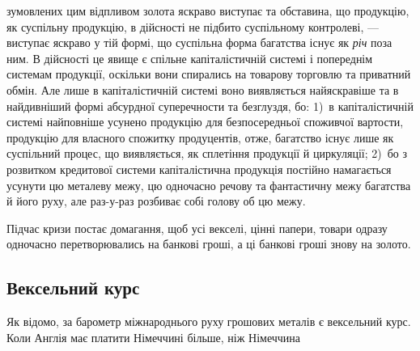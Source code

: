 зумовлених цим відпливом золота яскраво виступає та обставина, що продукцію,
як суспільну продукцію, в дійсності не підбито суспільному контролеві, —
виступає яскраво у тій формі, що суспільна форма багатства існує як \emph{річ} поза
ним. В дійсності це явище є спільне капіталістичній системі і попереднім системам
продукції, оскільки вони спирались на товарову торговлю та приватний
обмін. Але лише в капіталістичній системі воно виявляється найяскравіше та
в найдивніший формі абсурдної суперечности та безглуздя, бо: 1)~в капіталістичній
системі найповніше усунено продукцію для безпосередньої споживчої
вартости, продукцію для власного спожитку продуцентів, отже, багатство існує
лише як суспільний процес, що виявляється, як сплетіння продукції й циркуляції;
2)~бо з розвитком кредитової системи капіталістична продукція постійно
намагається усунути цю металеву межу, цю одночасно речову та фантастичну
межу багатства й його руху, але раз-у-раз розбиває собі голову об цю межу.

Підчас кризи постає домагання, щоб усі векселі, цінні папери, товари
одразу одночасно перетворювались на банкові гроші, а ці банкові гроші знову
на золото.

\subsection{Вексельний курс}

Як відомо, за барометр міжнароднього руху грошових металів є вексельний
курс. Коли Англія має платити Німеччині більше, ніж Німеччина
\parbreak{}  %
